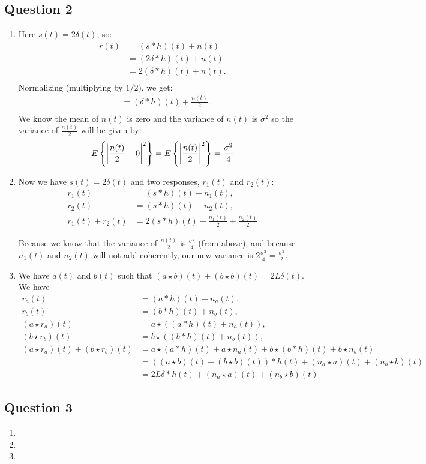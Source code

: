 \documentclass[11pt]{article}
\begin{document}
\subsection*{Question 2}
\begin{enumerate}
\item Here $s(t) = 2\delta(t)$, so:
\begin{align*}
r(t) &= (s * h)(t) + n(t) \\
&= (2\delta * h)(t) + n(t) \\
&= 2(\delta * h)(t) + n(t). \\
\end{align*}
Normalizing (multiplying by $1/2$), we get:
\begin{align*}
&= (\delta * h)(t) + \frac{n(t)}{2}. \\
\end{align*}
We know the mean of $n(t)$ is zero and the variance of $n(t)$ is $\sigma^2$ so the variance of $\frac{n(t)}{2}$ will be given by:
\begin{equation}
E\left\{ \left| \frac{n(t)}{2} - 0 \right|^2\right\} = E\left\{ \left| \frac{n(t)}{2}\right|^2\right\} = \frac{\sigma^2}{4}\\
\end{equation}

\item Now we have $s(t) = 2\delta(t)$ and two responses, $r_1(t)$ and $r_2(t)$:
\begin{align*}
r_1(t) &= (s * h)(t) + n_1(t), \\
r_2(t) &= (s * h)(t) + n_2(t), \\
r_1(t) + r_2(t) &= 2(s * h)(t) + \frac{n_1(t)}{2} + \frac{n_2(t)}{2}
\end{align*}

Because we know that the variance of $\frac{n(t)}{2}$ is $\frac{\sigma^2}{4}$ (from above), and because $n_1(t)$ and $n_2(t)$ will not add coherently,  our new variance is $2\frac{\sigma^2}{4} = \frac{\sigma^2}{2}$.

\item We have $a(t)$ and $b(t)$ such that $(a \star b)(t) + (b \star b)(t) = 2L\delta(t)$. We have
\begin{align*}
r_a(t) &= (a * h)(t) + n_a(t), \\
r_b(t) &= (b * h)(t) + n_b(t), \\
(a \star r_a)(t) &= a \star ((a * h)(t) + n_a(t)), \\
(b \star r_b)(t) &= b \star ((b * h)(t) + n_b(t)), \\
(a \star r_a)(t) + (b \star r_b)(t) &= a \star (a * h)(t) + a \star n_a(t) + b \star (b * h)(t) + b \star n_b(t)\\
&= ((a \star b)(t) + (b \star b)(t)) * h(t) + (n_a \star a)(t) + (n_b \star b)(t) \\
&= 2L\delta * h(t) + (n_a \star a)(t) + (n_b \star b)(t)
\end{align*}

\end{enumerate}

\subsection*{Question 3}
\begin{enumerate}
\item 
\item
\item
\end{enumerate}
\end{document}
